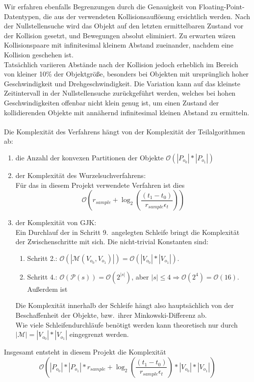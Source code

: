 Wir erfahren ebenfalls Begrenzungen durch die Genauigkeit von Floating-Point-Datentypen, die aus der verwendeten Kollisionsauflösung ersichtlich werden. Nach der Nullstellensuche wird das Objekt auf den letzten ermittelbaren Zustand vor der Kollision gesetzt, und Bewegungen absolut eliminiert. Zu erwarten wären Kollisionspaare mit infinitesimal kleinem Abstand zueinander, nachdem eine Kollision geschehen ist.\\
Tatsächlich variieren Abstände nach der Kollision jedoch erheblich im Bereich von kleiner 10\% der Objektgröße, besonders bei Objekten mit ursprünglich hoher Geschwindigkeit und Drehgeschwindigkeit. Die Variation kann auf das kleinste Zeitintervall in der Nullstellensuche zurückgeführt werden, welches bei hohen Geschwindigkeiten  offenbar nicht klein genug ist, um einen Zustand der kollidierenden Objekte mit annähernd infinitesimal kleinen Abstand zu ermitteln.\\
\\
Die Komplexität des Verfahrens hängt von der Komplexität der Teilalgorithmen ab:
\begin{enumerate}
\item die Anzahl der konvexen Partitionen der Objekte $\mathcal{O}(|P_{o_0}|*|P_{o_1}|)$
\item der Komplexität des Wurzelsuchverfahrens:\\
 Für das in diesem Projekt verwendete Verfahren ist dies $$\mathcal{O}(r_{sample} + \log_{2}(\frac{(t_1 - t_0)}{r_{sample}\epsilon_t} ))$$
\item der Komplexität von GJK:\\
Ein Durchlauf der in Schritt 9.~angelegten Schleife bringt die Komplexität der Zwischenschritte mit sich. Die nicht-trivial Konstanten sind:
\begin{enumerate}
\item Schritt 2.: $\mathcal{O}(|\mathcal{M}(V_{o_0}, V_{o_1})|) = \mathcal{O}(|V_{o_0}|*|V_{o_1}|)$.

\item Schritt 4.: $\mathcal{O}(\mathcal{P}(s)) = \mathcal{O}(2^{|s|})$, aber $|s| \leq 4 \Rightarrow \mathcal{O}(2^4) = \mathcal{O}(16)$. Außerdem ist 
\end{enumerate}
Die Komplexität innerhalb der Schleife hängt also hauptsächlich von der Beschaffenheit der Objekte, bzw.~ihrer Minkowski-Differenz ab.\\
Wie viele Schleifendurchläufe benötigt werden kann theoretisch nur durch $|\mathcal{M}| = |V_{o_0}|*|V_{o_1}|$ eingegrenzt werden.
\end{enumerate}
Insgesamt entsteht in diesem Projekt die Komplexität 
$$\mathcal{O}(|P_{o_0}|*|P_{o_1}| * r_{sample} + \log_{2}(\frac{(t_1 - t_0)}{r_{sample}\epsilon_t}) * |V_{o_0}|*|V_{o_1}| )$$


